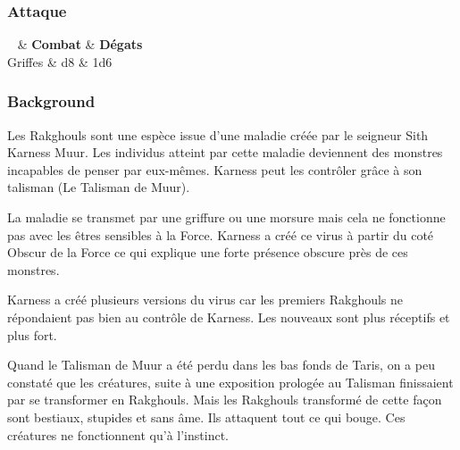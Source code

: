 \subsubsection{Attaque}
\begin{itemtable}[ X c c ]
	~ 		& \textbf{Combat} 	& \textbf{Dégats} \\
	Griffes	& d8 				& 1d6 
\end{itemtable}

\newpage
\subsubsection{Background}
Les Rakghouls sont une espèce issue d’une maladie créée par le seigneur Sith Karness Muur. Les individus atteint par cette maladie deviennent des monstres incapables de penser par eux-mêmes. Karness peut les contrôler grâce à son talisman (Le Talisman de Muur).

La maladie se transmet par une griffure ou une morsure mais cela ne fonctionne pas avec les êtres sensibles à la Force. Karness a créé ce virus à partir du coté Obscur de la Force ce qui explique une forte présence obscure près de ces monstres.

Karness a créé plusieurs versions du virus car les premiers Rakghouls ne répondaient pas bien au contrôle de Karness. Les nouveaux sont plus réceptifs et plus fort.

Quand le Talisman de Muur a été perdu dans les bas fonds de Taris, on a peu constaté que les créatures, suite à une exposition prologée au Talisman finissaient par se transformer en Rakghouls. Mais les Rakghouls transformé de cette façon sont bestiaux, stupides et sans âme. Ils attaquent tout ce qui bouge. Ces créatures ne fonctionnent qu’à l’instinct.

\clearpage
